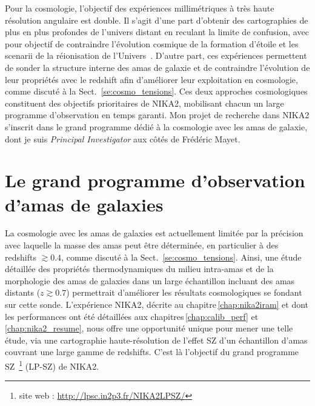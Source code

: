 Pour la cosmologie, l'objectif des expériences millimétriques à très
haute résolution angulaire est double. Il s'agit d'une part d'obtenir
des cartographies de plus en plus profondes
de l'univers distant en reculant la limite de confusion, avec pour
objectif de contraindre l'évolution cosmique de la formation d'étoile
et les scenarii de la réionisation de l'Univers~\citep{Mancuso2016,
  Bethermin2017_simu}. D'autre part, ces expériences permettent de
sonder la structure interne des amas de galaxie et de contraindre
l'évolution de leur propriétés avec le redshift afin d'améliorer leur
exploitation en cosmologie, comme discuté à la
Sect.~\ref{se:cosmo_tensions}. Ces deux approches cosmologiques
constituent des objectifs prioritaires de NIKA2,
mobilisant chacun un large programme d'observation en temps
garanti. Mon projet de recherche dans NIKA2 s'inscrit dans le grand
programme dédié à la cosmologie avec les amas de galaxie, dont je suis
\emph{Principal Investigator} aux côtés de Frédéric Mayet. 



%
%
%
%
%
%
%
%
\section{Le grand programme d'observation d'amas de galaxies}
\label{se:LP-SZ}

La cosmologie avec les amas de galaxies est actuellement limitée par
la précision avec laquelle la masse des amas peut être déterminée, en
particulier à des redshifts $\gtrsim 0.4$, comme discuté à la
Sect.~\ref{se:cosmo_tensions}. Ainsi, une étude détaillée des propriétés
thermodynamiques du milieu intra-amas et de la morphologie des amas de
galaxies dans un large échantillon incluant des amas distants
($z\gtrsim 0.7$) permettrait d'améliorer les résultats cosmologiques se
fondant sur cette sonde. L'expérience NIKA2, décrite au
chapitre\,\ref{chap:nika2iram} et dont les performances ont
été détaillées aux chapitres\,\ref{chap:calib_perf} et
\,\ref{chap:nika2_resume}, nous offre une opportunité unique pour mener
une telle étude, via une cartographie haute-résolution de l'effet SZ
d'un échantillon d'amas couvrant une large gamme de redshifts. C'est
là l'objectif du grand programme SZ~\footnote{site web :
  \url{http://lpsc.in2p3.fr/NIKA2LPSZ/}} (LP-SZ) de NIKA2.


